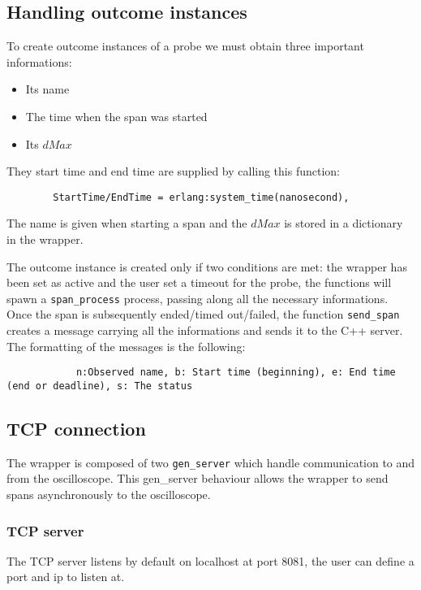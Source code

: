     \subsection{Handling outcome instances}
        To create outcome instances of a probe we must obtain three important informations:
        \begin{itemize}
            \item Its name
            \item The time when the span was started
            \item Its $dMax$
        \end{itemize}
        
        They start time and end time are supplied by calling this function:
        \begin{verbatim}
        StartTime/EndTime = erlang:system_time(nanosecond),
        \end{verbatim}
        The name is given when starting a span and the $dMax$ is stored in a dictionary in the wrapper. 

            The outcome instance is created only if two conditions are met: the wrapper has been set as active and the user set a timeout for the probe, the functions will spawn a \texttt{span\_process} process, passing along all the necessary informations. \\
        Once the span is subsequently ended/timed out/failed, the function \texttt{send\_span} creates a message carrying all the informations and sends it to the C++ server. The formatting of the messages is the following:
        \begin{verbatim}
            n:Observed name, b: Start time (beginning), e: End time (end or deadline), s: The status
        \end{verbatim}

    \subsection{TCP connection}
        The wrapper is composed of two \texttt{gen\_server} which handle communication to and from the oscilloscope. This gen\_server behaviour allows the wrapper to send spans asynchronously to the oscilloscope.

        \subsubsection{TCP server}
            The TCP server listens by default on localhost at port 8081, the user can define a port and ip to listen at.

